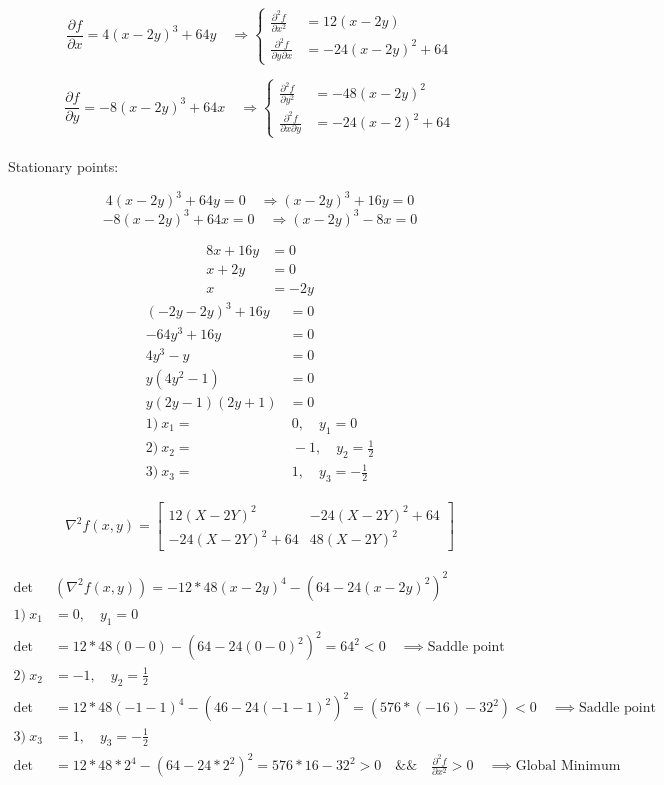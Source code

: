 \documentclass[12pt]{article}         %
\begin{document}
$$
\frac {\partial f}{\partial x} = 4(x-2y)^3 + 64y \quad\Rightarrow 
	\left\{
	\begin{aligned}
		\frac {\partial^2 f}{\partial x^2}&=12(x-2y)\\
		\frac {\partial^2 f}{\partial y \partial x}&=-24(x-2y)^2 +64
	 \end{aligned} 
	 \right.
$$

$$
\frac {\partial f}{\partial y} = -8(x-2y)^3 +64x \quad\Rightarrow 
	\left\{
	\begin{aligned}
		\frac {\partial^2 f}{\partial y^2}&=-48(x-2y)^2\\ 
		\frac {\partial^2 f}{\partial x \partial y}&=-24(x-2)^2 +64
	 \end{aligned} 
	 \right.
$$\\

Stationary points:

$$
4(x-2y)^3 +64y=0  \quad\Rightarrow 
(x-2y)^3 + 16y=0
$$
$$
-8(x-2y)^3+64x=0  \quad\Rightarrow
(x-2y)^3 -8x=0
$$

$$
\begin{aligned}
8x+16y&=0\\
x+2y&=0\\
x&=-2y
\end{aligned}
$$
$$
\begin{aligned}
(-2y -2y)^3 +16y&=0\\
-64y^3 +16y&=0\\
4y^3 -y&=0\\
y(4y^2 -1)&=0\\
y(2y-1)(2y+1)&=0\\
1)\: x_1=&\:0,\quad y_1=0\\
2)\: x_2=&\: -\!1,\quad y_2=\frac{1}{2}\\ 
3)\: x_3=&\:1,\quad y_3=-\frac{1}{2}
\end{aligned}
$$

\begin{gather}
\nabla^2 f(x,y) = 
  \begin{bmatrix}
  12 (X - 2Y)^2 &
  -24 (X - 2Y)^2 + 64\\
  -24 (X - 2Y)^2  +64 &
  48 (X - 2Y)^2 
   \end{bmatrix}
    \nonumber
\end{gather}


$$
\begin{aligned}
\det&\left(\nabla^2 f(x,y)\right)=-12*48(x-2y)^4 -(64-24(x-2y)^2)^2\\
1)\: x_1&=0, \quad y_1=0\\
\det&=12*48(0-0) - (64-24(0-0)^2)^2 =64^2 < 0   \quad\implies \text{Saddle point}\\
2)\: x_2&=-1, \quad y_2=\frac{1}{2}\\
\det&=12*48(-1-1)^4 -(46-24(-1-1)^2)^2=(576*(-16)-32^2)<0 \quad\implies \text{Saddle point}\\
3)\: x_3&=1, \quad y_3=-\frac{1}{2}\\
\det&=12*48*2^4 -(64 -24*2^2)^2 = 576*16-32^2>0 \quad \&\& \quad \frac {\partial^2 f}{\partial x^2} > 0 \quad\implies \text{Global Minimum}\\
\end{aligned}
$$
 \pagebreak
\end{document}
